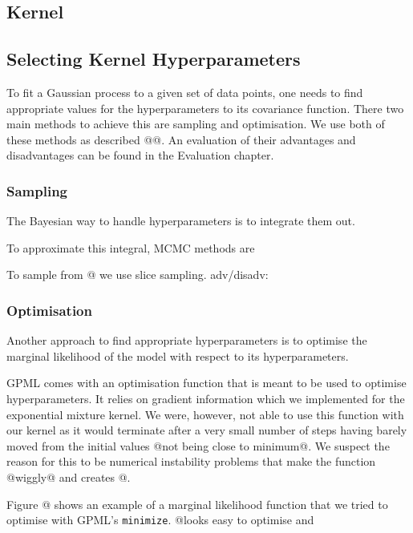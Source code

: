 \documentclass[a4paper,12pt,twoside,openright]{report}
\begin{document}
\subsection{Kernel}
\subsection{Selecting Kernel Hyperparameters}
To fit a Gaussian process to a given set of data points, one needs to find appropriate values for the hyperparameters to its covariance function. There two main methods to achieve this are sampling and optimisation. We use both of these methods as described @@. An evaluation of their advantages and disadvantages can be found in the Evaluation chapter.

\subsubsection{Sampling}
The Bayesian way to handle hyperparameters is to integrate them out. 

To approximate this integral, MCMC methods are

To sample from @ we use slice sampling. adv/disadv: \cite{neal2003}



\subsubsection{Optimisation}
Another approach to find appropriate hyperparameters is to optimise the marginal likelihood of the model with respect to its hyperparameters.

GPML comes with an optimisation function that is meant to be used to optimise hyperparameters. It relies on gradient information which we implemented for the exponential mixture kernel. We were, however, not able to use this function with our kernel as it would terminate after a very small number of steps having barely moved from the initial values @not being close to minimum@. We suspect the reason for this to be numerical instability problems that make the function @wiggly@ and creates @.

Figure @ shows an example of a marginal likelihood function that we tried to optimise with GPML's \texttt{minimize}. @looks easy to optimise and 
\end{document}

